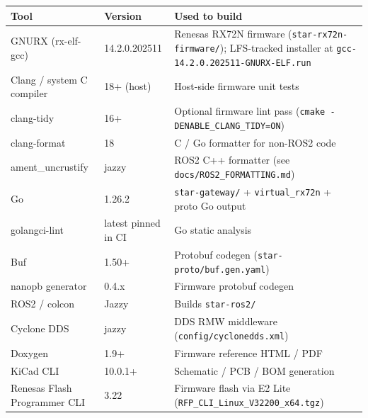 \begin{center}
\begin{tabular}{|p{4.0cm}|p{4.0cm}|p{6.5cm}|}
\hline
\textbf{Tool}                  & \textbf{Version}     & \textbf{Used to build}                                                              \\
\hline
GNURX (rx-elf-gcc)             & 14.2.0.202511        & Renesas RX72N firmware (\texttt{star-rx72n-firmware/}); LFS-tracked installer at \texttt{gcc-14.2.0.202511-GNURX-ELF.run} \\
Clang / system C compiler      & 18+ (host)           & Host-side firmware unit tests                                                        \\
clang-tidy                     & 16+                  & Optional firmware lint pass (\texttt{cmake -DENABLE\_CLANG\_TIDY=ON})                \\
clang-format                   & 18                   & C / Go formatter for non-ROS2 code                                                   \\
ament\_uncrustify              & jazzy                & ROS2 C++ formatter (see \texttt{docs/ROS2\_FORMATTING.md})                            \\
Go                             & 1.26.2               & \texttt{star-gateway/} + \texttt{virtual\_rx72n} + proto Go output                    \\
golangci-lint                  & latest pinned in CI  & Go static analysis                                                                   \\
Buf                            & 1.50+                & Protobuf codegen (\texttt{star-proto/buf.gen.yaml})                                  \\
nanopb generator               & 0.4.x                & Firmware protobuf codegen                                                            \\
ROS2 / colcon                  & Jazzy                & Builds \texttt{star-ros2/}                                                           \\
Cyclone DDS                    & jazzy                & DDS RMW middleware (\texttt{config/cyclonedds.xml})                                   \\
Doxygen                        & 1.9+                 & Firmware reference HTML / PDF                                                        \\
KiCad CLI                      & 10.0.1+              & Schematic / PCB / BOM generation                                                     \\
Renesas Flash Programmer CLI   & 3.22                 & Firmware flash via E2 Lite (\texttt{RFP\_CLI\_Linux\_V32200\_x64.tgz})               \\
\hline
\end{tabular}
\end{center}

